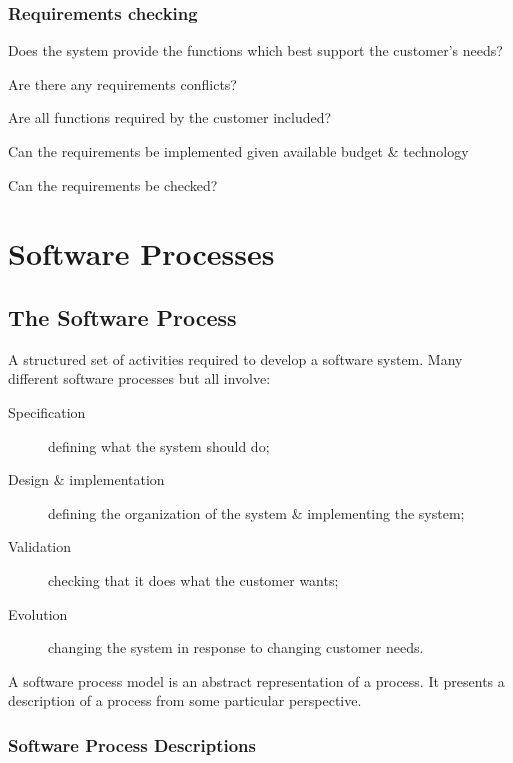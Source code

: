 \documentclass{report}
\newcommand{\textr}[1]{\textcolor{red}{#1}}
\begin{document}
\subsection{Requirements checking}
\begin{description}[style=multiline,leftmargin=8em]
  \item [\textr{Validity}] Does the system provide the functions which best support
the customer's needs?
  \item [\textr{Consistency}] Are there any requirements conflicts?
  \item [\textr{Completeness}] Are all functions required by the customer included?
  \item [\textr{Realism}] Can the requirements be implemented given available budget
\& technology
  \item [\textr{Verifiability}] Can the requirements be checked?
\end{description}



\chapter{Software Processes}
\section{The Software Process}
A structured set of activities required to develop a software system.\newline
Many different software processes but all involve:
\begin{description}
  \item [Specification] defining what the system should do;
  \item [Design \& implementation] defining the organization of the
system \& implementing the system;
  \item [Validation] checking that it does what the customer wants;
  \item [Evolution] changing the system in response to changing
customer needs.
\end{description}
A software process model is an abstract representation of a process. It presents a description of a process from some particular perspective.

\subsection{Software Process Descriptions}
\end{document}
